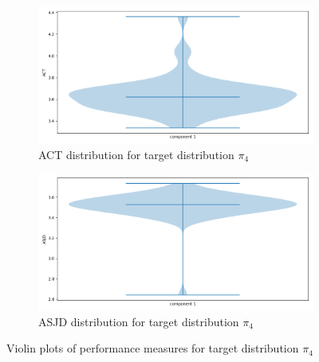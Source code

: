 \documentclass{scrartcl}
\begin{document}
    \begin{figure}
        \centering
        \begin{subfigure}{0.42\textheight}
              \centering
              \includegraphics[width=.8\linewidth]{../figs/ACT_pi_4.png}
              \caption{ACT distribution for target distribution $\pi_4$}
              \label{violin_plots_pi_4_act}
        \end{subfigure}
        \begin{subfigure}{0.42\textheight}
              \centering
              \includegraphics[width=.8\linewidth]{../figs/ASJD_pi_4.png}
              \caption{ASJD distribution for target distribution $\pi_4$}
              \label{violin_plots_pi_4_asjd}
        \end{subfigure}
        \caption{Violin plots of performance measures for target distribution $\pi_4$}
        \label{violin_plots_pi_4}
    \end{figure}
\end{document}
